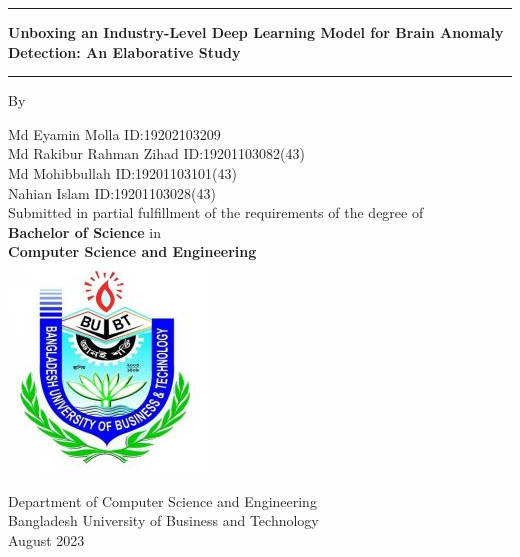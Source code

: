 
\begin{titlepage}
    \begin{center}
    \hrule
    \vspace{2mm}
     \large \textbf{Unboxing an Industry-Level Deep Learning Model for Brain Anomaly Detection: An Elaborative Study}
    \vspace{2mm}
    \hrule 
    \vspace{20mm}
    By\\
    \vspace{10mm}
   
    Md Eyamin Molla \hspace{23mm} ID:19202103209\\
    Md Rakibur Rahman Zihad \hspace{12mm} ID:19201103082(43)\\
    Md Mohibbullah \hspace{30mm} ID:19201103101(43)\\
   Nahian Islam \hspace{34mm} ID:19201103028(43)\\
    
    \vspace{40mm}
    \large Submitted in partial fulfillment of the requirements of the degree of\\
\large  \textbf{Bachelor of Science} in\\
\large \textbf{Computer Science and Engineering}\\
\vspace{15mm}
\includegraphics[scale=0.5]{img/BUBT_logo.jpg}

\large Department of Computer Science and Engineering\\
\large Bangladesh University of Business and Technology\\
\vspace{6mm}
\large August 2023
    
    \end{center}
\end{titlepage}